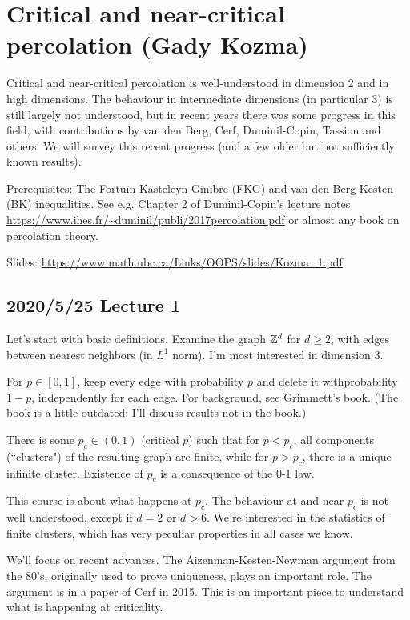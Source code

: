 
\section{Critical and near-critical percolation (Gady Kozma)}

Critical and near-critical percolation is well-understood in dimension 2 and in high dimensions. The behaviour in intermediate dimensions (in particular 3) is still largely not understood, but in recent years there was some progress in this field, with contributions by van den Berg, Cerf, Duminil-Copin, Tassion and others. We will survey this recent progress (and a few older but not sufficiently known results).

Prerequisites: The Fortuin-Kasteleyn-Ginibre (FKG) and van den Berg-Kesten (BK) inequalities. See e.g. Chapter 2 of Duminil-Copin's lecture notes \url{https://www.ihes.fr/~duminil/publi/2017percolation.pdf} or almost any book on percolation theory. 

Slides: \url{https://www.math.ubc.ca/Links/OOPS/slides/Kozma_1.pdf}

\subsection*{2020/5/25 Lecture 1}

Let's start with basic definitions. Examine the graph $\mathbb{Z}^d$ for $d\ge 2$, with edges between nearest neighbors (in $L^1$ norm). I'm most interested in dimension 3.

For $p\in [0,1]$, keep every edge with probability $p$ and delete it withprobability $1-p$, independently for each edge. For background, see Grimmett's book. (The book is a little outdated; I'll discuss results not in the book.) %

There is some $p_c\in (0,1)$ (critical $p$) such that for $p<p_c$, all components (``clusters") of the resulting graph are finite, while for $p>p_c$, there is a unique infinite cluster. 
Existence of $p_c$ is a consequence of the 0-1 law.

This course is about what happens at $p_c$. The behaviour at and near $p_c$ is not well understood, except if $d=2$ or $d>6$. We're interested in the statistics of finite clusters, which has very peculiar properties in all cases we know.

We'll focus on recent advances. The Aizenman-Kesten-Newman argument from the 80's, originally used to prove uniqueness, plays an important role. The argument is in a paper of Cerf in 2015. This is an important piece to understand what is happening at criticality.

